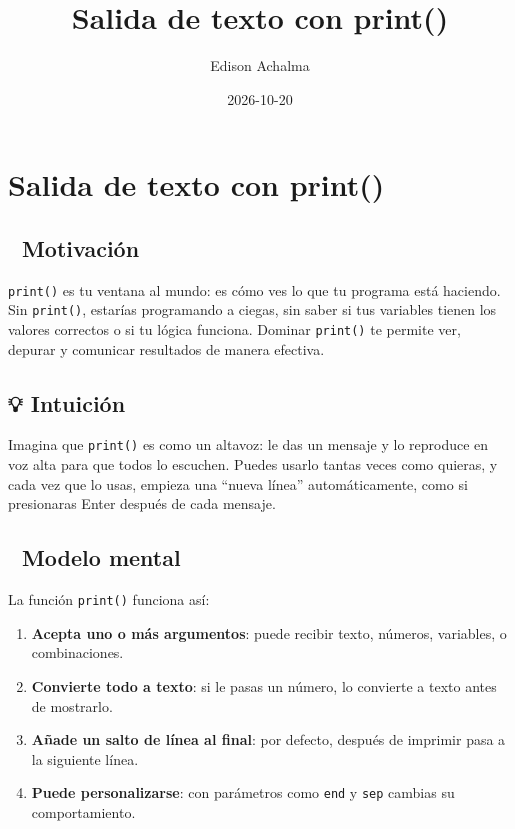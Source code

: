 \documentclass[
  doc,
  floatsintext,
  longtable,
  a4paper,
  nolmodern,
  notxfonts,
  notimes,
  12pt,
  colorlinks=true,linkcolor=blue,citecolor=blue,urlcolor=blue]{apa7}
\title{Salida de texto con print()}
\author{Edison Achalma}
\affiliation{
{Escuela Profesional de Economía, Universidad Nacional de San Cristóbal
de Huamanga}}
\date{2026-10-20}
\providecommand{\tightlist}{%
  \setlength{\itemsep}{0pt}\setlength{\parskip}{0pt}}
\begin{document}
\maketitle


\hypertarget{toc}{}
\tableofcontents
\newpage
\section[Introduction]{Salida de texto con print()}

\setcounter{secnumdepth}{3}

\setlength\LTleft{0pt}




\subsection{🎯 Motivación}\label{motivaciuxf3n}

\texttt{print()} es tu ventana al mundo: es cómo ves lo que tu programa
está haciendo. Sin \texttt{print()}, estarías programando a ciegas, sin
saber si tus variables tienen los valores correctos o si tu lógica
funciona. Dominar \texttt{print()} te permite ver, depurar y comunicar
resultados de manera efectiva.

\subsection{💡 Intuición}\label{intuiciuxf3n}

Imagina que \texttt{print()} es como un altavoz: le das un mensaje y lo
reproduce en voz alta para que todos lo escuchen. Puedes usarlo tantas
veces como quieras, y cada vez que lo usas, empieza una ``nueva línea''
automáticamente, como si presionaras Enter después de cada mensaje.

\subsection{🧠 Modelo mental}\label{modelo-mental}

La función \texttt{print()} funciona así:

\begin{enumerate}
\def\labelenumi{\arabic{enumi}.}
\tightlist
\item
  \textbf{Acepta uno o más argumentos}: puede recibir texto, números,
  variables, o combinaciones.
\item
  \textbf{Convierte todo a texto}: si le pasas un número, lo convierte a
  texto antes de mostrarlo.
\item
  \textbf{Añade un salto de línea al final}: por defecto, después de
  imprimir pasa a la siguiente línea.
\item
  \textbf{Puede personalizarse}: con parámetros como \texttt{end} y
  \texttt{sep} cambias su comportamiento.
\end{enumerate}
\end{document}
